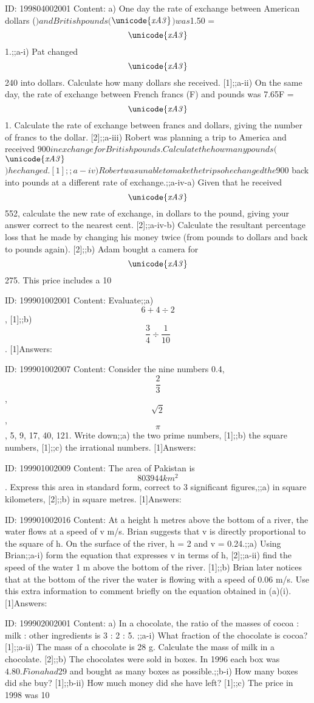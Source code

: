 \documentclass{article}
\begin{document}
ID: 199804002001
Content:
a) One day the rate of exchange between American dollars ($) and British pounds ($$\it\unicode{xA3}$$) was $1.50 = $$\it\unicode{xA3}$$1.;;a-i) Pat changed $$\it\unicode{xA3}$$240 into dollars. Calculate how many dollars she received. [1];;a-ii) On the same day, the rate of exchange between French francs (F) and pounds was 7.65F = $$\it\unicode{xA3}$$1. Calculate the rate of exchange between francs and dollars, giving the number of francs to the dollar. [2];;a-iii) Robert was planning a trip to America and received $900 in exchange for British pounds. Calculate the how many pounds ($$\it\unicode{xA3}$$) he changed. [1];;a-iv) Robert was unable to make the trip so he changed the $900 back into pounds at a different rate of exchange.;;a-iv-a) Given that he received $$\it\unicode{xA3}$$552, calculate the new rate of exchange, in dollars to the pound, giving your answer correct to the nearest cent. [2];;a-iv-b) Calculate the resultant percentage loss that he made by changing his money twice (from pounds to dollars and back to pounds again). [2];;b) Adam bought a camera for $$\it\unicode{xA3}$$275. This price includes a 10%

ID: 199901002001
Content:
Evaluate;;a) $$6+4\div2$$, [1];;b) $$\frac{3}{4}\div \frac{1}{10}$$. [1]Answers:

ID: 199901002007
Content:
Consider the nine numbers 0.4, $$\frac{2}{3}$$, $$\sqrt{2}$$, $$\pi$$, 5, 9, 17, 40, 121. Write down;;a) the two prime numbers, [1];;b) the square numbers, [1];;c) the irrational numbers. [1]Answers:

ID: 199901002009
Content:
The area of Pakistan is $$803944km^{2} $$. Express this area in standard form, correct to 3 significant figures,;;a) in square kilometers, [2];;b) in square metres. [1]Answers:

ID: 199901002016
Content:
At a height h metres above the bottom of a river, the water flows at a speed of v m/s. Brian suggests that v is directly proportional to the square of h. On the surface of the river, h = 2 and v = 0.24.;;a) Using Brian;;a-i) form the equation that expresses v in terms of h, [2];;a-ii) find the speed of the water 1 m above the bottom of the river. [1];;b) Brian later notices that at the bottom of the river the water is flowing with a speed of 0.06 m/s. Use this extra information to comment briefly on the equation obtained in (a)(i). [1]Answers:

ID: 199902002001
Content:
a) In a chocolate, the ratio of the masses of cocoa : milk : other ingredients is 3 : 2 : 5. ;;a-i) What fraction of the chocolate is cocoa? [1];;a-ii) The mass of a chocolate is 28 g. Calculate the mass of milk in a chocolate. [2];;b) The chocolates were sold in boxes. In 1996 each box was $4.80. Fiona had $29 and bought as many boxes as possible.;;b-i) How many boxes did she buy? [1];;b-ii) How much money did she have left? [1];;c) The price in 1998 was 10%
\end{document}
